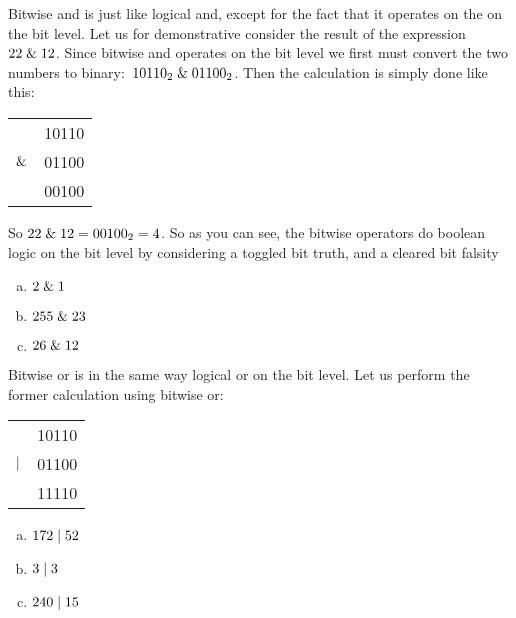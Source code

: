 Bitwise and is just like logical and, except for the fact that it
operates on the on the bit level. Let us for demonstrative consider
the result of the expression $22 \mathrel{\&} 12$. Since bitwise and
operates on the bit level we first must convert the two numbers to
binary:\mbox{ $\mbox{\ensuremath{10110_2}} \mathrel{\&} \mbox{\ensuremath{01100_2}}$}. Then the calculation is simply done
like this:

\begin{center}
  \begin{tabular}{lr}
    & 10110  \\
    $\mathrel{\&}$ & 01100 \\
    \hline
    & 00100 \\
  \end{tabular}
\end{center}

So $22 \mathrel{\&} 12 = \mbox{\ensuremath{00100_2}} = 4$. So as you can see, the bitwise
operators do boolean logic on the bit level by considering a toggled
bit truth, and a cleared bit falsity

\begin{Exercise}[label={bitand}]

  \begin{enumerate}[(a)]
  \item $2 \mathrel{\&} 1$
  \item $255 \mathrel{\&} 23$
  \item $26 \mathrel{\&} 12$
  \end{enumerate}
\end{Exercise}

Bitwise or is in the same way logical or on the bit level. Let us
perform the former calculation using bitwise or:

\begin{center}
  \begin{tabular}{lr}
    & 10110  \\
    $\mathrel{|}$ & 01100 \\
    \hline
    & 11110 \\
  \end{tabular}
\end{center}

\begin{Exercise}[label={bitor}]
  \begin{enumerate}[(a)]
  \item $172 \mathrel{|} 52$
  \item $3 \mathrel{|} 3$
  \item $240 \mathrel{|} 15$
  \end{enumerate}
\end{Exercise}

